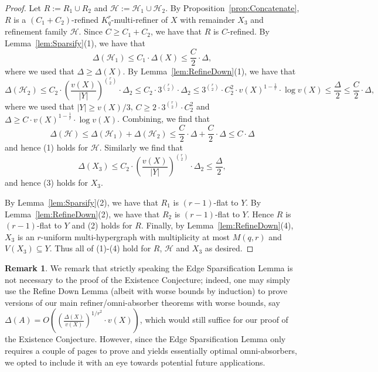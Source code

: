 \documentclass[11pt]{article}
\newcounter{i}
\theoremstyle{plain}
\theoremstyle{plain} %
\theoremstyle{definition}
\newtheorem{remark}[thm]{Remark}
\begin{document}
\begin{proof}
Let $R:= R_1\cup R_2$ and $\mathcal{H}:=\mathcal{H}_1\cup \mathcal{H}_2$. By Proposition~\ref{prop:Concatenate}, $R$ is a $(C_1+C_2)$-refined $K_q^r$-multi-refiner of $X$ with remainder $X_3$ and refinement family $\mathcal{H}$. Since $C\ge C_1+C_2$, we have that $R$ is $C$-refined. By Lemma~\ref{lem:Sparsify}(1), we have that 
$$\Delta(\mathcal{H}_1)\le C_1\cdot \Delta(X) \le \frac{C}{2}\cdot \Delta,$$
where we used that $\Delta \ge \Delta(X)$. By Lemma~\ref{lem:RefineDown}(1), we have that
$$\Delta(\mathcal{H}_2) \le C_2 \cdot  \left(\frac{v(X)}{|Y|}\right)^{\binom{r}{2}} \cdot \Delta_2 \le C_2 \cdot 3^{\binom{r}{2}} \cdot \Delta_2 \le 3^{\binom{r}{2}} \cdot C_2^2 \cdot v(X)^{1-\frac{1}{r}}\cdot \log v(X) \le \frac{\Delta}{2} \le \frac{C}{2}\cdot \Delta,$$
where we used that $|Y|\ge v(X)/3$, $C\ge 2\cdot 3^{\binom{r}{2}} \cdot C_2^2$ and $\Delta \ge C \cdot v(X)^{1-\frac{1}{r}}\cdot \log v(X)$. Combining, we find that
$$\Delta(\mathcal{H})\le \Delta(\mathcal{H}_1)+\Delta(\mathcal{H}_2) \le \frac{C}{2}\cdot \Delta + \frac{C}{2}\cdot \Delta \le C\cdot \Delta$$
and hence (1) holds for $\mathcal{H}$. Similarly we find that 
$$\Delta(X_3) \le C_2 \cdot  \left(\frac{v(X)}{|Y|}\right)^{\binom{r}{2}} \cdot \Delta_2 \le \frac{\Delta}{2},$$
and hence (3) holds for $X_3$.

By Lemma~\ref{lem:Sparsify}(2), we have that $R_1$ is $(r-1)$-flat to $Y$. By Lemma~\ref{lem:RefineDown}(2), we have that $R_2$ is $(r-1)$-flat to $Y$. Hence $R$ is $(r-1)$-flat to $Y$ and (2) holds for $R$. Finally, by Lemma~\ref{lem:RefineDown}(4), $X_3$ is an $r$-uniform multi-hypergraph with multiplicity at most $M(q,r)$ and $V(X_3)\subseteq Y$. Thus all of (1)-(4) hold for $R$, $\mathcal{H}$ and $X_3$ as desired. 
\end{proof}

\begin{remark}
We remark that strictly speaking the Edge Sparsification Lemma is not necessary to the proof of the Existence Conjecture; indeed, one may simply use the Refine Down Lemma (albeit with worse bounds by induction) to prove versions of our main refiner/omni-absorber theorems with worse bounds, say $\Delta(A)= O\left( \left(\frac{\Delta(X)}{v(X)}\right)^{1/r^2} \cdot v(X)\right)$, which would still suffice for our proof of the Existence Conjecture.  However, since the Edge Sparsification Lemma only requires a couple of pages to prove and yields essentially optimal omni-absorbers, we opted to include it with an eye towards potential future applications.    
\end{remark}
\end{document}
